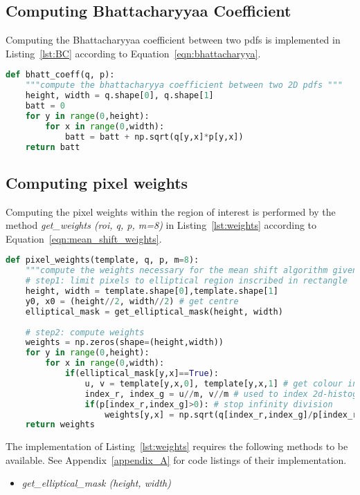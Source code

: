 \subsection{Computing Bhattacharyyaa Coefficient}
Computing the Bhattacharyyaa coefficient between two pdfs is implemented in
Listing~\ref{lst:BC} according to Equation~\ref{eqn:bhattacharyya}. 

\begin{lstlisting}[language=Python, caption={Computing Bhattacharyya Coefficient}, captionpos=b, label={lst:BC}]
def bhatt_coeff(q, p):
    """compute the bhattacharyya coefficient between two 2D pdfs """
    height, width = q.shape[0], q.shape[1]
    batt = 0
    for y in range(0,height):
        for x in range(0,width):
            batt = batt + np.sqrt(q[y,x]*p[y,x])
    return batt
\end{lstlisting}

\subsection{Computing pixel weights}
Computing the pixel weights within the region of interest is performed by the
method \textit{get\_weights (roi, q, p, m=8)} in Listing~\ref{lst:weights} according to Equation~\ref{eqn:mean_shift_weights}.

\begin{lstlisting}[language=Python, caption={Computing Mean Shift Weights}, captionpos=b, label={lst:weights}]
def pixel_weights(template, q, p, m=8):
    """compute the weights necessary for the mean shift algorithm given q and p"""
    # step1: limit pixels to elliptical region inscribed in rectangle
    height, width = template.shape[0],template.shape[1]
    y0, x0 = (height//2, width//2) # get centre 
    elliptical_mask = get_elliptical_mask(height, width)
    
    # step2: compute weights
    weights = np.zeros(shape=(height,width))
    for y in range(0,height):
        for x in range(0,width): 
            if(elliptical_mask[y,x]==True):  
                u, v = template[y,x,0], template[y,x,1] # get colour index, u 
                index_r, index_g = u//m, v//m # used to index 2d-histogram
                if(p[index_r,index_g]>0): # stop infinity division
                    weights[y,x] = np.sqrt(q[index_r,index_g]/p[index_r,index_g]) # comp weight
    return weights 
\end{lstlisting}

The implementation of Listing~\ref{lst:weights} requires the following methods to
be available. See Appendix~\ref{appendix_A} for code listings of their implementation. 
\begin{itemize}
    \item \textit{get\_elliptical\_mask (height, width)}
\end{itemize}

